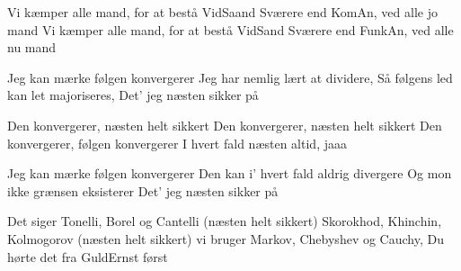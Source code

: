 \documentclass[a4paper,11pt]{article}
\begin{document}
\begin{song}
%
Vi kæmper alle mand, for at bestå VidSaand
Sværere end KomAn, ved alle jo mand
Vi kæmper alle mand, for at bestå VidSand
Sværere end FunkAn, ved alle nu mand

%
Jeg kan mærke følgen konvergerer
Jeg har nemlig lært at dividere, 
Så følgens led kan let majoriseres, 
Det' jeg næsten sikker på

%
Den konvergerer, næsten helt sikkert
Den konvergerer, næsten helt sikkert
Den konvergerer, følgen konvergerer
I hvert fald næsten altid, jaaa

%
Jeg kan mærke følgen konvergerer
Den kan i' hvert fald aldrig divergere
Og mon ikke grænsen eksisterer
Det' jeg næsten sikker på

%
Det siger Tonelli, Borel og Cantelli (næsten helt sikkert)
Skorokhod, Khinchin, Kolmogorov (næsten helt sikkert)
vi bruger Markov, Chebyshev og Cauchy,  
Du hørte det fra GuldErnst først
\end{song}
\end{document}
